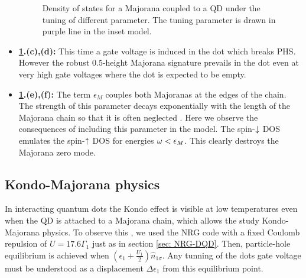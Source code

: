 \begin{itemize}
\begin{figure}[h]
     \caption{Density of states for a Majorana coupled to a QD under the tuning of different parameter. The tuning parameter is drawn in purple line in the inset model.  \label{fig:M1-Tot} \protect{}}
\end{figure}

  
    \item\textbf{ \ref{fig:M1-Tot}.(c),(d):} This time a gate voltage is induced in the dot which breaks PHS. However the robust $0.5$-height Majorana signature prevails in the dot even at very high gate voltages where the dot is expected to be empty.
    
    \item\textbf{ \ref{fig:M1-Tot}.(e),(f):} The term $\epsilon_M$ couples both Majoranas at the edges of the chain. The strength of this parameter decays exponentially with the length of the Majorana  chain so that it is often neglected . Here we observe the consequences of including this parameter in the model. The spin-$\downarrow$ DOS emulates the spin-$\uparrow$ DOS for energies $\omega < \epsilon_M$. This clearly destroys the Majorana zero mode.   
\end{itemize}







\subsection{Kondo-Majorana physics}

In interacting quantum dots the Kondo effect is visible at low temperatures even when the QD is attached to a Majorana chain, which allows the study Kondo-Majorana physics. To observe this , we used the NRG code with a fixed Coulomb repulsion of $U = 17.6\Gamma_1$ just as in section \ref{sec: NRG-DQD}. Then, particle-hole equilibrium is achieved when $\left(\epsilon_{1}+\frac{U_1}{2}\right)\hat{n}_{1\sigma}$. Any tunning of the dots gate voltage must be understood as a displacement $\Delta \epsilon_1$ from this equilibrium point. 

